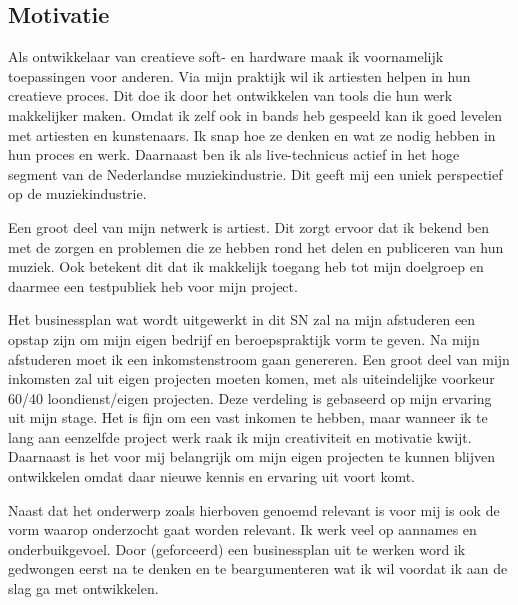 \subsection{Motivatie}
Als ontwikkelaar van creatieve soft- en hardware maak ik voornamelijk toepassingen voor anderen. Via mijn praktijk wil ik artiesten helpen in hun creatieve proces. Dit doe ik door het ontwikkelen van tools die hun werk makkelijker maken. Omdat ik zelf ook in bands heb gespeeld kan ik goed levelen met artiesten en kunstenaars. Ik snap hoe ze denken en wat ze nodig hebben in hun proces en werk. Daarnaast ben ik als live-technicus actief in het hoge segment van de Nederlandse muziekindustrie. Dit geeft mij een uniek perspectief op de muziekindustrie.

Een groot deel van mijn netwerk is artiest. Dit zorgt ervoor dat ik bekend ben met de zorgen en problemen die ze hebben rond het delen en publiceren van hun muziek. Ook betekent dit dat ik makkelijk toegang heb tot mijn doelgroep en daarmee een testpubliek heb voor mijn project.

Het businessplan wat wordt uitgewerkt in dit SN zal na mijn afstuderen een opstap zijn om mijn eigen bedrijf en beroepspraktijk vorm te geven. Na mijn afstuderen moet ik een inkomstenstroom gaan genereren. Een groot deel van mijn inkomsten zal uit eigen projecten moeten komen, met als uiteindelijke voorkeur 60/40 loondienst/eigen projecten. Deze verdeling is gebaseerd op mijn ervaring uit mijn stage. Het is fijn om een vast inkomen te hebben, maar wanneer ik te lang aan eenzelfde project werk raak ik mijn creativiteit en motivatie kwijt. Daarnaast is het voor mij belangrijk om mijn eigen projecten te kunnen blijven ontwikkelen omdat daar nieuwe kennis en ervaring uit voort komt.

Naast dat het onderwerp zoals hierboven genoemd relevant is voor mij is ook de vorm waarop onderzocht gaat worden relevant. Ik werk veel op aannames en onderbuikgevoel. Door (geforceerd) een businessplan uit te werken word ik gedwongen eerst na te denken en te beargumenteren wat ik wil voordat ik aan de slag ga met ontwikkelen.

